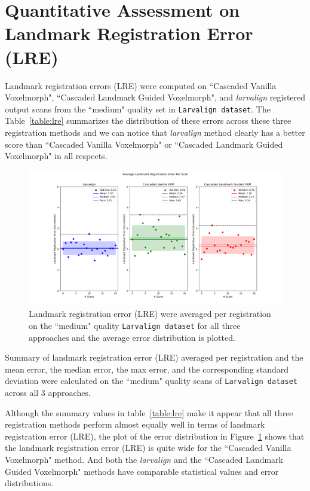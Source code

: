 \documentclass{book}
\begin{document}
	\section{Quantitative Assessment on Landmark Registration Error (LRE)}
	Landmark registration errors (LRE) were computed on ``Cascaded Vanilla Voxelmorph", ``Cascaded Landmark Guided Voxelmorph", and \textit{larvalign} registered output scans from the ``medium" quality set in \texttt{Larvalign dataset}. The Table~\ref{table:lre} summarizes the distribution of these errors across these three registration methods and we can notice that \textit{larvalign} method clearly has a better score than ``Cascaded Vanilla Voxelmorph" or ``Cascaded Landmark Guided Voxelmorph" in all respects. 
	
	\begin{figure}[h!]
		\centering
		\includegraphics[width=0.9\columnwidth]{resources/chapter5_fresh/stats_per_scan_output/Stats_Per_Landmark.png}
		\caption{Landmark registration error (LRE) were averaged per registration on the ``medium" quality \texttt{Larvalign dataset} for all three approaches and the average error distribution is plotted.}
		\label{fig:mean_stats_per_scan}
	\end{figure}

	\begin{table}[h!]
		\centering
		
		\caption{Summary of landmark registration error (LRE) averaged per registration and the mean error, the median error, the max error, and the corresponding standard deviation were calculated on the ``medium" quality scans of \texttt{Larvalign dataset} across all 3 approaches.}
		\label{table:lre}
	\end{table}
	
	Although the summary values in table~\ref{table:lre} make it appear that all three registration methods perform almost equally well in terms of landmark registration error (LRE), the plot of the error distribution in Figure~\ref{fig:mean_stats_per_scan} shows that the landmark registration error (LRE) is quite wide for the ``Cascaded Vanilla Voxelmorph" method. And both the \textit{larvalign} and the ``Cascaded Landmark Guided Voxelmorph" methods have comparable statistical values and error distributions.
	
\end{document}
